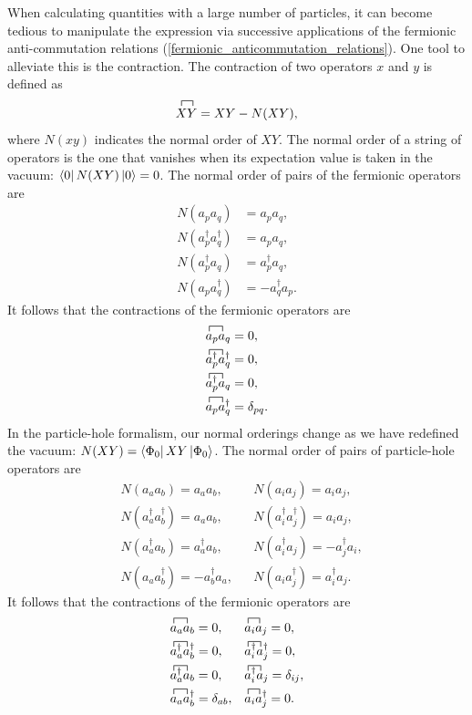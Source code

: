 \documentclass[Dual]{msu-thesis}
\begin{document}
When calculating quantities with a large number of particles, it can become tedious to manipulate the expression via successive applications of the fermionic anti-commutation relations (\ref{fermionic_anticommutation_relations}). One tool to alleviate this is the contraction. The contraction of two operators $x$ and $y$ is defined as
\begin{align}
\contraction{}{X}{}{Y}XY = XY-N(XY),
\end{align}
where $N(xy)$ indicates the normal order of $XY$. The normal order of a string of operators is the one that vanishes when its expectation value is taken in the vacuum: $\bra{0}N(XY)\ket{0}=0$. The normal order of pairs of the fermionic operators are 
\begin{align}
N(a_pa_q)&=a_pa_q,
\\
N(a^\dagger_pa^\dagger_q)&=a_pa_q,
\\
N(a^\dagger_pa_q)&=a^\dagger_pa_q,
\\
N(a_pa^\dagger_q)&=-a^\dagger_qa_p.
\end{align}
It follows that the contractions of the fermionic operators are
\begin{align}
\contraction{}{a}{_p}{a}a_pa_q
&=
0,
\\
\contraction{}{a}{^\dagger_p}{a}a^\dagger_pa^\dagger_q
&=
0,
\\
\contraction{}{a}{^\dagger_p}{a}a^\dagger_pa_q
&=
0,
\\
\contraction{}{a}{_p}{a}a_pa^\dagger_q
&=
\delta_{pq}.
\end{align}
In the particle-hole formalism, our normal orderings change as we have redefined the vacuum: $N(XY)=\bra{\Phi_0}XY\ket{\Phi_0}$. The normal order of pairs of particle-hole operators are
\begin{align}
&N(a_aa_b)=a_aa_b, 
&&N(a_ia_j)=a_ia_j,
\\
&N(a^\dagger_aa^\dagger_b)=a_aa_b, &&N(a^\dagger_ia^\dagger_j)=a_ia_j,
\\
&N(a^\dagger_aa_b)=a^\dagger_aa_b, &&N(a^\dagger_ia_j)=-a^\dagger_ja_i,
\\
&N(a_aa^\dagger_b)=-a^\dagger_ba_a, &&N(a_ia^\dagger_j)=a^\dagger_ia_j.
\end{align}
It follows that the contractions of the fermionic operators are
\begin{align}
&
\contraction{}{a}{_a}{a}a_aa_b
=
0,
&&
\contraction{}{a}{_i}{a}a_ia_j
=
0,
\\
&
\contraction{}{a}{^\dagger_a}{a}a^\dagger_aa^\dagger_b
=
0,
&&
\contraction{}{a}{^\dagger_i}{a}a^\dagger_ia^\dagger_j
=
0,
\\
&
\contraction{}{a}{^\dagger_a}{a}a^\dagger_aa_b
=
0,
&&
\contraction{}{a}{^\dagger_i}{a}a^\dagger_ia_j
=
\delta_{ij},
\\
&
\contraction{}{a}{_a}{a}a_aa^\dagger_b
=
\delta_{ab},
&&
\contraction{}{a}{_i}{a}a_ia^\dagger_j
=
0.
\end{align}
\end{document}
